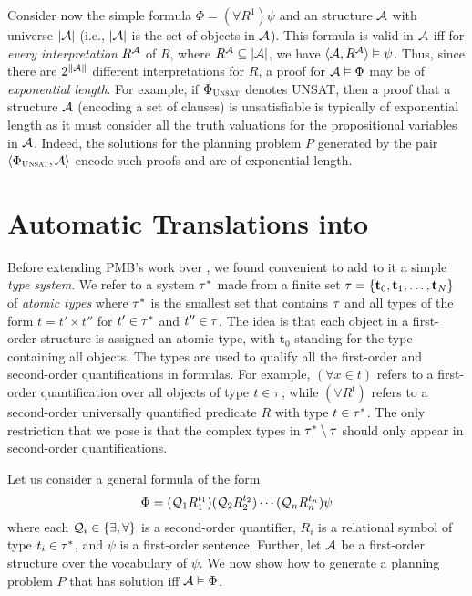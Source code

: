 Consider now the simple formula $\Phi=(\forall R^1)\psi$
and an structure $\mathcal{A}$ with universe $|\mathcal{A}|$ (i.e., $|\mathcal{A}|$
is the set of objects in $\mathcal{A}$).
This formula is valid in $\mathcal{A}$ iff for \emph{every interpretation}
$R^{\mathcal{A}}$ of $R$, where $R^{\mathcal{A}}\subseteq|\mathcal{A}|$, we have $\langle \mathcal{A},R^{\mathcal{A}} \rangle\vDash\psi$.
Thus, since there are $2^{\|\mathcal{A}\|}$ different interpretations for $R$,
a proof for $\mathcal{A}\vDash\Phi$ may be of \emph{exponential length}.
For example, if $\Phi_{\textsc{Unsat}}$ denotes UNSAT, then a proof that a
structure $\mathcal{A}$ (encoding a set of clauses) is unsatisfiable is
typically of exponential length as it must consider all the truth
valuations for the propositional variables in $\mathcal{A}$.
Indeed, the solutions for the planning problem $P$ generated
by the pair $\langle \Phi_{\textsc{Unsat}},\mathcal{A} \rangle$ encode such proofs and are
of exponential length.


\section{Automatic Translations into \STRIPS}

Before extending PMB's work over \PH, we found convenient to add
to it a simple \emph{type system}. We refer to a
system $\tau^*$ made from a finite set $\tau=\{\mathbf{t}_0,\mathbf{t}_1,\ldots,\mathbf{t}_N\}$
of \emph{atomic types} where $\tau^*$ is the smallest set that
contains $\tau$ and all types of the form $t=t'\times t''$
for $t'\in\tau^*$ and $t''\in\tau$.
The idea is that each object in a first-order structure
is assigned an atomic type, with $\mathbf{t}_0$ standing for the
type containing all objects.
The types are used to qualify all the first-order and
second-order quantifications in formulas.
For example, $(\forall x\in t)$ refers to a first-order
quantification over all objects of type $t\in\tau$, while
$(\forall R^t)$ refers to a second-order universally
quantified predicate $R$ with type $t\in\tau^*$.
The only restriction that we pose is that the complex
types in $\tau^*\setminus\tau$ should only appear in
second-order quantifications.

\medskip

Let us consider a general \SO formula of the form 
\begin{equation}
\Phi = (\mathcal{Q}_1R_1^{t_1})(\mathcal{Q}_2R_2^{t_2})\cdots(\mathcal{Q}_nR_n^{t_n})\psi
\end{equation}
where each $\mathcal{Q}_i\in\{\exists,\forall\}$ is a second-order
quantifier,  $R_i$ is a relational symbol of type $t_i\in\tau^*$,
and $\psi$ is a first-order sentence.
Further, let $\mathcal{A}$ be a first-order structure over the
vocabulary of $\psi$.
We now show how to generate a planning problem $P$ 
that has solution iff $\mathcal{A}\vDash\Phi$.

